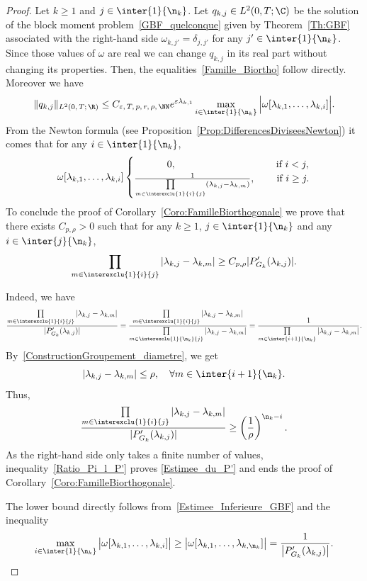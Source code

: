 \begin{proof}
Let $k \geq 1$ and $j \in \inter{1}{\n_k}$. Let $q_{k,j} \in L^2(0,T ; \C)$ be the solution of the block moment problem~\eqref{GBF_quelconque} given by Theorem~\ref{Th:GBF} associated with the right-hand side $\omega_{k, j'} = \delta_{j,j'}$ for any $j' \in \inter{1}{\n_k}$. Since those values of $\omega$ are real we can change $q_{k,j}$ in its real part without changing its properties. Then, the equalities~\eqref{Famille_Biortho} follow directly. Moreover we have
\[
\| q_{k,j} \|_{L^2(0,\,T ;\,\R)} \leq C_{\varepsilon,\,T,\,p,\,r,\,\rho,\,\NN} e^{\varepsilon \lambda_{k,1}} \max \limits_{i\in \inter{1}{\n_k}} \Big| \omega[\lambda_{k,1}, \dots, \lambda_{k,i}] \Big|.
\]
From the Newton formula (see Proposition~\ref{Prop:DifferencesDiviseesNewton}) it comes that for any $i \in \inter{1}{\n_k}$,
\begin{equation*}
\omega[\lambda_{k,1}, \dots, \lambda_{k,i}] \begin{cases}
\mkern60mu 0,& \quad\;\text{if }i<j,\\
\frac{1}{\prod\limits_{m \in \interexclu{1}{i}{j}} (\lambda_{k,j}-\lambda_{k,m})},&\quad \text{ if }i\geq j.
\end{cases}
\end{equation*}
To conclude the proof of Corollary~\ref{Coro:FamilleBiorthogonale} we prove that there exists $C_{p, \rho}>0$ such that for any $k\geq 1$, $j \in \inter{1}{\n_k}$ and any $i \in \inter{j}{\n_k}$,
\begin{equation}\label{Estimee_du_P'}
\prod_{m \in \interexclu{1}{i}{j}} | \lambda_{k,j} - \lambda_{k,m}| \geq C_{p,\rho} |P_{G_k}' (\lambda_{k,j}) |.
\end{equation}

Indeed, we have
\begin{equation*}
\frac{ \prod\limits_{m\in \interexclu{1}{i}{j} } | \lambda_{k,j} - \lambda_{k,m}|}{|P_{G_k}' (\lambda_{k,j}) |} = \frac{\prod\limits_{m\in \interexclu{1}{i}{j}} | \lambda_{k,j} - \lambda_{k,m}|}{\prod\limits_{m\in \interexclu{1}{\n_k}{j}} | \lambda_{k,j} - \lambda_{k,m}|} = \frac{1}{\prod\limits_{m\in \inter{i+1}{\n_k}} | \lambda_{k,j} - \lambda_{k,m}|}.
\end{equation*}
By~\eqref{ConstructionGroupement_diametre}, we get
\[
|\lambda_{k,j}-\lambda_{k,m}| \leq \rho, \quad \forall m \in \inter{i+1}{\n_k}.
\]
Thus,
\begin{equation}\label{Ratio_Pi_l_P'}
\frac{\prod\limits_{m\in \interexclu{1}{i}{j} } | \lambda_{k,j} - \lambda_{k,m}|}{|P_{G_k}' (\lambda_{k,j}) |}
\geq \left(\frac{1}{\rho} \right)^{\n_k-i}.
\end{equation}
As the right-hand side only takes a finite number of values, inequality~\eqref{Ratio_Pi_l_P'} proves \eqref{Estimee_du_P'} and ends the proof of Corollary~\ref{Coro:FamilleBiorthogonale}.

The lower bound directly follows from~\eqref{Estimee_Inferieure_GBF} and the inequality
\[
\max \limits_{i\in \inter{1}{\n_k}} \big| \omega[\lambda_{k,1}, \dots, \lambda_{k,i}] \big| \geq \big| \omega[\lambda_{k,1}, \dots, \lambda_{k,\n_k}] \big| = \frac{1}{\left| P_{G_k}'(\lambda_{k,j}) \right| }.\qedhere
\]
\end{proof}



